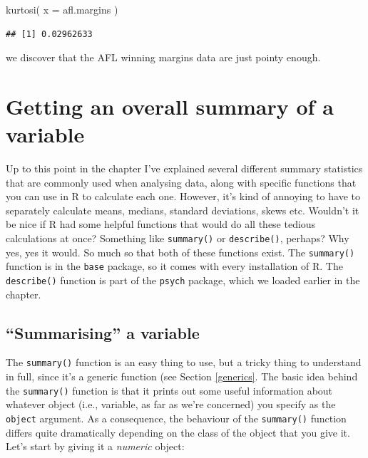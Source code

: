 \documentclass[
]{book}
\newenvironment{Shaded}{\begin{snugshade}}{\end{snugshade}}
\newcommand{\AttributeTok}[1]{\textcolor[rgb]{0.77,0.63,0.00}{#1}}
\newcommand{\FunctionTok}[1]{\textcolor[rgb]{0.00,0.00,0.00}{#1}}
\newcommand{\NormalTok}[1]{#1}
\begin{document}
\begin{Shaded}
\begin{Highlighting}[]
\FunctionTok{kurtosi}\NormalTok{( }\AttributeTok{x =}\NormalTok{ afl.margins )}
\end{Highlighting}
\end{Shaded}

\begin{verbatim}
## [1] 0.02962633
\end{verbatim}

we discover that the AFL winning margins data are just pointy enough.

\hypertarget{descriptive-summary}{%
\section{Getting an overall summary of a variable}\label{descriptive-summary}}

Up to this point in the chapter I've explained several different summary statistics that are commonly used when analysing data, along with specific functions that you can use in R to calculate each one. However, it's kind of annoying to have to separately calculate means, medians, standard deviations, skews etc. Wouldn't it be nice if R had some helpful functions that would do all these tedious calculations at once? Something like \texttt{summary()} or \texttt{describe()}, perhaps? Why yes, yes it would. So much so that both of these functions exist. The \texttt{summary()} function is in the \texttt{base} package, so it comes with every installation of R. The \texttt{describe()} function is part of the \texttt{psych} package, which we loaded earlier in the chapter.

\hypertarget{summarising-a-variable}{%
\subsection{``Summarising'' a variable}\label{summarising-a-variable}}

The \texttt{summary()} function is an easy thing to use, but a tricky thing to understand in full, since it's a generic function (see Section \ref{generics}. The basic idea behind the \texttt{summary()} function is that it prints out some useful information about whatever object (i.e., variable, as far as we're concerned) you specify as the \texttt{object} argument. As a consequence, the behaviour of the \texttt{summary()} function differs quite dramatically depending on the class of the object that you give it. Let's start by giving it a \emph{numeric} object:
\end{document}
